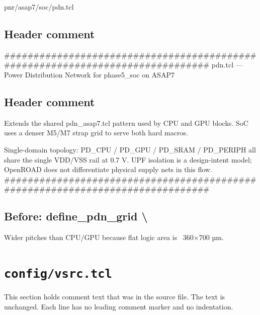 \begin{relocated}{pnr/asap7/soc/pdn.tcl}

\subsection*{Header comment}

\begin{textblock}
##############################################################################
pdn.tcl — Power Distribution Network for phase5_soc on ASAP7
\end{textblock}

\subsection*{Header comment}

\begin{textblock}
Extends the shared pdn_asap7.tcl pattern used by CPU and GPU blocks.
SoC uses a denser M5/M7 strap grid to serve both hard macros.

Single-domain topology: PD_CPU / PD_GPU / PD_SRAM / PD_PERIPH all share
the single VDD/VSS rail at 0.7 V.  UPF isolation is a design-intent model;
OpenROAD does not differentiate physical supply nets in this flow.
##############################################################################
\end{textblock}

\subsection*{Before: define\_pdn\_grid \textbackslash{}}

\begin{textblock}
Wider pitches than CPU/GPU because flat logic area is ~360×700 µm.
\end{textblock}

\end{relocated}

\section{\texttt{config/vsrc.tcl}}\label{tm:pd:config-vsrc-tcl}

This section holds comment text that was in the source file. The text is unchanged. Each line has no leading comment marker and no indentation.

